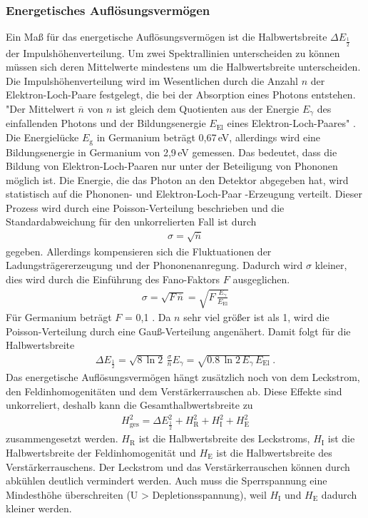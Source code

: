 \subsubsection{Energetisches Auflösungsvermögen}
\label{sec:EAuflösung}
Ein Maß für das energetische Auflösungsvermögen ist die Halbwertsbreite $\Delta E_\frac{1}{2}$ der Impulshöhenverteilung. Um zwei Spektrallinien unterscheiden zu können müssen sich deren Mittelwerte mindestens um die Halbwertsbreite unterscheiden. \\
Die Impulshöhenverteilung wird im Wesentlichen durch die Anzahl $n$ der Elektron-Loch-Paare festgelegt, die bei der Absorption eines Photons entstehen. "Der Mittelwert $\overline{n}$ von $n$ ist gleich dem Quotienten aus der Energie $E_\gamma$ des einfallenden Photons und der Bildungsenergie $E_\text{El}$ eines Elektron-Loch-Paares" \cite[14]{V18}. Die Energielücke $E_\text{g}$ in Germanium beträgt 0,67\,eV, allerdings wird eine Bildungsenergie in Germanium von 2,9\,eV gemessen. Das bedeutet, dass die Bildung von Elektron-Loch-Paaren nur unter der Beteiligung von Phononen möglich ist. Die Energie, die das Photon an den Detektor abgegeben hat, wird statistisch auf die Phononen- und Elektron-Loch-Paar -Erzeugung verteilt. Dieser Prozess wird durch eine Poisson-Verteilung beschrieben und die Standardabweichung für den unkorrelierten Fall ist durch
\begin{align}
	\sigma = \sqrt{\overline{n}}
\end{align}
gegeben. Allerdings kompensieren sich die Fluktuationen der Ladungsträgererzeugung und der Phononenanregung. Dadurch wird $\sigma$ kleiner, dies wird durch die Einführung des Fano-Faktors $F$ ausgeglichen.
\begin{align}
	\sigma = \sqrt{F\,\overline{n}} = \sqrt{F\,\frac{E_\gamma}{E_\text{El}}}
\end{align}
Für Germanium beträgt $F$ = 0,1 \cite[15]{V18}. Da $n$ sehr viel größer ist als 1, wird die Poisson-Verteilung durch eine Gauß-Verteilung angenähert. Damit folgt für die Halbwertsbreite
\begin{align}
	\Delta E_\frac{1}{2} = \sqrt{8\,\ln2} \, \frac{\sigma} {\overline{n}} E_\gamma = \sqrt{0.8\,\ln2\,E_\gamma \, E_\text{El}} \ .
\end{align}
Das energetische Auflösungsvermögen hängt zusätzlich noch von dem Leckstrom, den Feldinhomogenitäten und dem Verstärkerrauschen ab. Diese Effekte sind unkorreliert, deshalb kann die Gesamthalbwertsbreite zu
\begin{align}
	H_\text{ges}^2 = \Delta E_\frac{1}{2}^2 + H_\text{R}^2 + H_\text{I}^2 + H_\text{E}^2
\end{align}
zusammengesetzt werden. $H_\text{R}$ ist die Halbwertsbreite des Leckstroms, $H_\text{I}$ ist die Halbwertsbreite der Feldinhomogenität und $H_\text{E}$ ist die Halbwertsbreite des Verstärkerrauschens. Der Leckstrom und das Verstärkerrauschen können durch abkühlen deutlich vermindert werden. Auch muss die Sperrspannung eine Mindesthöhe überschreiten (U > Depletionsspannung), weil $H_\text{I}$ und $H_\text{E}$ dadurch kleiner werden.



